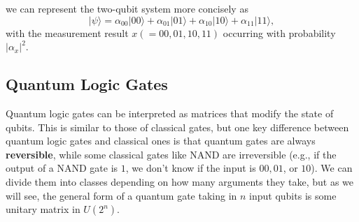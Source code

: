 \documentclass{article}
\theoremstyle{definition}
\begin{document}
we can represent the two-qubit system more concisely as
\[|\psi \rangle = \alpha_{00} |00\rangle + \alpha_{01} |01\rangle + \alpha_{10} |10\rangle + \alpha_{11} |11\rangle,\]
with the measurement result $x ( = 00, 01, 10, 11)$ occurring with probability $|\alpha_{x}|^2$.

\subsection*{Quantum Logic Gates}
Quantum logic gates can be interpreted as matrices that modify the state of qubits. This is similar to those of classical gates, but one key difference between quantum logic gates and classical ones is that quantum gates are always \textbf{reversible}, while some classical gates like NAND are irreversible (e.g., if the output of a NAND gate is $1$, we don't know if the input is $00, 01$, or $10$). We can divide them into classes depending on how many arguments they take, but as we will see, the general form of a quantum gate taking in $n$ input qubits is some unitary matrix in $U(2^n)$.
\end{document}
